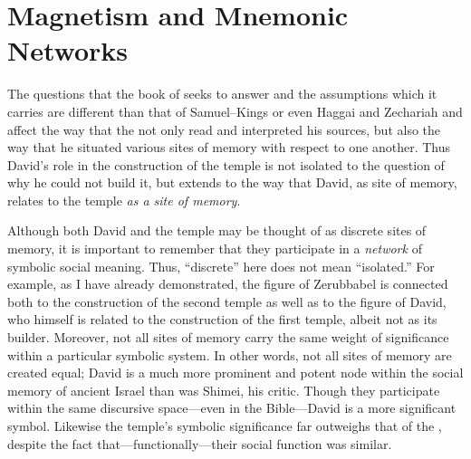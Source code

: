 
\section{Magnetism and Mnemonic Networks}

The questions that the book of \chronicles seeks to answer and the assumptions which it carries are different than that of Samuel--Kings or even Haggai and Zechariah and affect the way that the \chronicler not only read and interpreted his sources, but also the way that he situated various sites of memory with respect to one another. Thus David's role in the construction of the temple is not isolated to the question of why he could not build it, but extends to the way that David, as site of memory, relates to the temple \emph{as a site of memory}.

Although both David and the temple may be thought of as discrete sites of memory, it is important to remember that they participate in a \emph{network} of symbolic social meaning. Thus, ``discrete'' here does not mean ``isolated.'' For example, as I have already demonstrated, the figure of Zerubbabel is connected both to the construction of the second temple as well as to the figure of David, who himself is related to the construction of the first temple, albeit not as its builder. Moreover, not all sites of memory carry the same weight of significance within a particular symbolic system. In other words, not all sites of memory are created equal; David is a much more prominent and potent node within the social memory of ancient Israel than was Shimei, his critic. Though they participate within the same discursive space---even in the Bible---David is a more significant symbol. Likewise the temple's symbolic significance far outweighs that of the , despite the fact that---functionally---their social function was similar.

